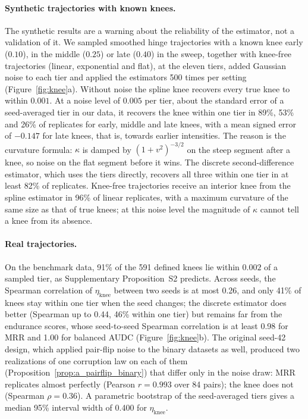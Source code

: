 \documentclass[pdflatex,sn-mathphys]{sn-jnl}
\theoremstyle{thmstyleone}
\theoremstyle{thmstyletwo}
\theoremstyle{thmstylethree}
\newcommand{\etaknee}{\eta_{\mathrm{knee}}}
\begin{document}
\paragraph{Synthetic trajectories with known knees.} The synthetic results are a warning about the reliability of the estimator, not a validation of it. We sampled smoothed hinge trajectories with a known knee early ($0.10$), in the middle ($0.25$) or late ($0.40$) in the sweep, together with knee-free trajectories (linear, exponential and flat), at the eleven tiers, added Gaussian noise to each tier and applied the estimators 500 times per setting (Figure~\ref{fig:knee}a). Without noise the spline knee recovers every true knee to within $0.001$. At a noise level of $0.005$ per tier, about the standard error of a seed-averaged tier in our data, it recovers the knee within one tier in 89\%, 53\% and 26\% of replicates for early, middle and late knees, with a mean signed error of $-0.147$ for late knees, that is, towards earlier intensities. The reason is the curvature formula: $\kappa$ is damped by $(1+v^2)^{-3/2}$ on the steep segment after a knee, so noise on the flat segment before it wins. The discrete second-difference estimator, which uses the tiers directly, recovers all three within one tier in at least 82\% of replicates. Knee-free trajectories receive an interior knee from the spline estimator in 96\% of linear replicates, with a maximum curvature of the same size as that of true knees; at this noise level the magnitude of $\kappa$ cannot tell a knee from its absence.

\paragraph{Real trajectories.} On the benchmark data, 91\% of the 591 defined knees lie within $0.002$ of a sampled tier, as Supplementary Proposition~S2 predicts. Across seeds, the Spearman correlation of $\etaknee$ between two seeds is at most 0.26, and only 41\% of knees stay within one tier when the seed changes; the discrete estimator does better (Spearman up to 0.44, 46\% within one tier) but remains far from the endurance scores, whose seed-to-seed Spearman correlation is at least 0.98 for MRR and 1.00 for balanced AUDC (Figure~\ref{fig:knee}b). The original seed-42 design, which applied pair-flip noise to the binary datasets as well, produced two realizations of one corruption law on each of them (Proposition~\ref{prop:a_pairflip_binary}) that differ only in the noise draw: MRR replicates almost perfectly (Pearson $r=0.993$ over 84 pairs); the knee does not (Spearman $\rho=0.36$). A parametric bootstrap of the seed-averaged tiers gives a median 95\% interval width of 0.400 for $\etaknee$.
\end{document}
